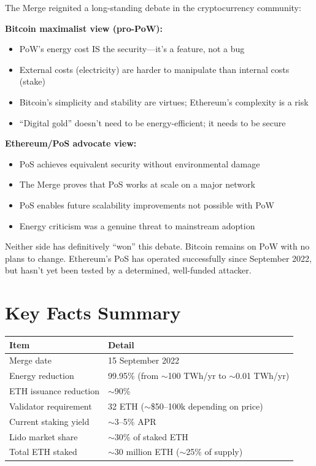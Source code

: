 \documentclass[11pt]{article}
\begin{document}
The Merge reignited a long-standing debate in the cryptocurrency community:

\medskip
\noindent\textbf{Bitcoin maximalist view (pro-PoW):}
\begin{itemize}[leftmargin=*]
\item PoW's energy cost IS the security---it's a feature, not a bug
\item External costs (electricity) are harder to manipulate than internal costs (stake)
\item Bitcoin's simplicity and stability are virtues; Ethereum's complexity is a risk
\item ``Digital gold'' doesn't need to be energy-efficient; it needs to be secure
\end{itemize}

\medskip
\noindent\textbf{Ethereum/PoS advocate view:}
\begin{itemize}[leftmargin=*]
\item PoS achieves equivalent security without environmental damage
\item The Merge proves that PoS works at scale on a major network
\item PoS enables future scalability improvements not possible with PoW
\item Energy criticism was a genuine threat to mainstream adoption
\end{itemize}

\medskip
Neither side has definitively ``won'' this debate. Bitcoin remains on PoW with no plans to change. Ethereum's PoS has operated successfully since September 2022, but hasn't yet been tested by a determined, well-funded attacker.

\section*{Key Facts Summary}

\begin{center}
\begin{tabular}{ll}
\toprule
\textbf{Item} & \textbf{Detail} \\
\midrule
Merge date & 15 September 2022 \\
Energy reduction & 99.95\% (from $\sim$100 TWh/yr to $\sim$0.01 TWh/yr) \\
ETH issuance reduction & $\sim$90\% \\
Validator requirement & 32 ETH ($\sim$\$50--100k depending on price) \\
Current staking yield & $\sim$3--5\% APR \\
Lido market share & $\sim$30\% of staked ETH \\
Total ETH staked & $\sim$30 million ETH ($\sim$25\% of supply) \\
\bottomrule
\end{tabular}
\end{center}
\end{document}
